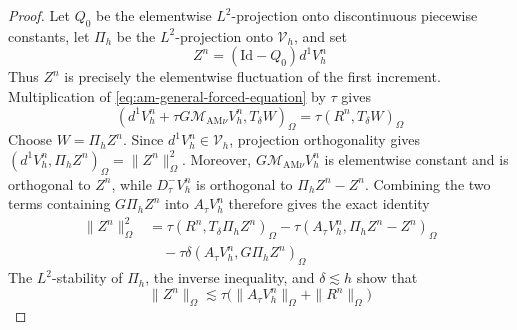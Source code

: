 \documentclass[11pt]{article}
\begin{document}
\begin{proof}
Let \(Q_0\) be the elementwise \(L^2\)-projection onto discontinuous
piecewise constants, let \(\Pi_h\) be the \(L^2\)-projection onto
\(\mathcal V_h\), and set
\begin{equation}
Z^n=(\mathrm{Id}-Q_0)d^1V_h^n
\label{eq:adams-piecewise-affine-fluctuation}
\end{equation}
Thus \(Z^n\) is precisely the elementwise fluctuation of the first increment.
Multiplication of \eqref{eq:am-general-forced-equation} by \(\tau\) gives
\begin{equation}
(d^1V_h^n+\tau G\mathcal M_{\mathrm{AM}\nu}V_h^n,
T_{\delta}W)_{\Omega}
=\tau(R^n,T_{\delta}W)_{\Omega}
\label{eq:adams-piecewise-affine-multiplied-equation}
\end{equation}
Choose \(W=\Pi_hZ^n\). Since \(d^1V_h^n\in\mathcal V_h\), projection
orthogonality gives
\((d^1V_h^n,\Pi_hZ^n)_{\Omega}=\|Z^n\|_{\Omega}^2\).
Moreover, \(G\mathcal M_{\mathrm{AM}\nu}V_h^n\) is elementwise constant and
is orthogonal to \(Z^n\), while
\(D_{\tau}^{-}V_h^n\) is orthogonal to \(\Pi_hZ^n-Z^n\). Combining the
two terms containing \(G\Pi_hZ^n\) into \(A_{\tau}V_h^n\) therefore gives
the exact identity
\begin{align}
\|Z^n\|_{\Omega}^2
&=\tau(R^n,T_{\delta}\Pi_hZ^n)_{\Omega}
-\tau(A_{\tau}V_h^n,\Pi_hZ^n-Z^n)_{\Omega}
\label{eq:adams-piecewise-affine-fluctuation-identity-main}\\
&\quad-\tau\delta(A_{\tau}V_h^n,G\Pi_hZ^n)_{\Omega}
\label{eq:adams-piecewise-affine-fluctuation-identity-streamline}
\end{align}
The \(L^2\)-stability of \(\Pi_h\), the inverse inequality, and
\(\delta\lesssim h\) show that
\begin{equation}
\|Z^n\|_{\Omega}
\lesssim\tau\bigl(\|A_{\tau}V_h^n\|_{\Omega}
+\|R^n\|_{\Omega}\bigr)
\label{eq:adams-piecewise-affine-fluctuation-bound}
\end{equation}


\end{proof}
\end{document}
